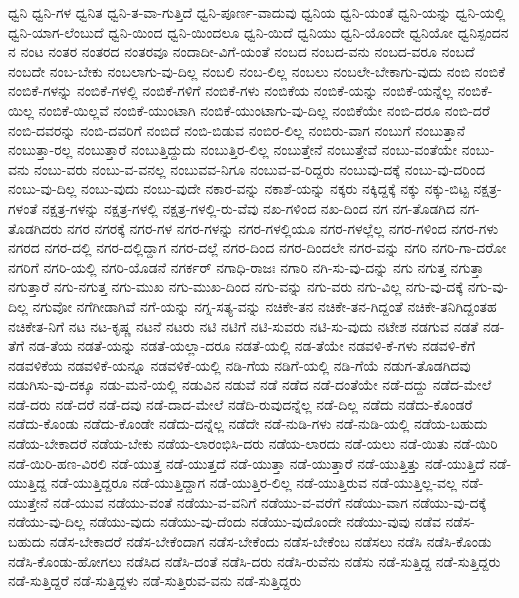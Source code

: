 {ಧ್ವನಿ
ಧ್ವನಿ-ಗಳ
ಧ್ವನಿತ
ಧ್ವನಿ-ತ-ವಾ-ಗುತ್ತಿದೆ
ಧ್ವನಿ-ಪೂರ್ಣ-ವಾದುವು
ಧ್ವನಿಯ
ಧ್ವನಿ-ಯಂತೆ
ಧ್ವನಿ-ಯನ್ನು
ಧ್ವನಿ-ಯಲ್ಲಿ
ಧ್ವನಿ-ಯಾಗ-ಲೆಂಬುದೆ
ಧ್ವನಿ-ಯಿಂದ
ಧ್ವನಿ-ಯಿಂದಲೂ
ಧ್ವನಿ-ಯಿದೆ
ಧ್ವನಿಯು
ಧ್ವನಿ-ಯೊಂದೇ
ಧ್ವನಿಯೋ
ಧ್ವನಿಸ್ಪಂದನ
ನ
ನಂಟ
ನಂತರ
ನಂತರದ
ನಂತರವೂ
ನಂದಾದೀ-ವಿಗೆ-ಯಂತೆ
ನಂಬದ
ನಂಬದ-ವನು
ನಂಬದ-ವರೂ
ನಂಬದೆ
ನಂಬದೇ
ನಂಬ-ಬೇಕು
ನಂಬಲಾಗು-ವು-ದಿಲ್ಲ
ನಂಬಲಿ
ನಂಬ-ಲಿಲ್ಲ
ನಂಬಲು
ನಂಬಲೇ-ಬೇಕಾಗು-ವುದು
ನಂಬಿ
ನಂಬಿಕೆ
ನಂಬಿಕೆ-ಗಳನ್ನು
ನಂಬಿಕೆ-ಗಳಲ್ಲಿ
ನಂಬಿಕೆ-ಗಳಿಗೆ
ನಂಬಿಕೆ-ಗಳು
ನಂಬಿಕೆಯ
ನಂಬಿಕೆ-ಯನ್ನು
ನಂಬಿಕೆ-ಯನ್ನೆಲ್ಲ
ನಂಬಿಕೆ-ಯಿಲ್ಲ
ನಂಬಿಕೆ-ಯಿಲ್ಲವೆ
ನಂಬಿಕೆ-ಯುಂಟಾಗಿ
ನಂಬಿಕೆ-ಯುಂಟಾಗು-ವು-ದಿಲ್ಲ
ನಂಬಿಕೆಯೇ
ನಂಬಿ-ದರೂ
ನಂಬಿ-ದರೆ
ನಂಬಿ-ದವರನ್ನು
ನಂಬಿ-ದವರಿಗೆ
ನಂಬಿದೆ
ನಂಬಿ-ಬಿಡುವ
ನಂಬಿರ-ಲಿಲ್ಲ
ನಂಬಿರು-ವಾಗ
ನಂಬುಗೆ
ನಂಬುತ್ತಾನೆ
ನಂಬುತ್ತಾ-ರಲ್ಲ
ನಂಬುತ್ತಾರೆ
ನಂಬುತ್ತಿದ್ದುದು
ನಂಬುತ್ತಿರ-ಲಿಲ್ಲ
ನಂಬುತ್ತೇನೆ
ನಂಬುತ್ತೇವೆ
ನಂಬು-ವಂತೆಯೇ
ನಂಬು-ವನು
ನಂಬು-ವರು
ನಂಬು-ವ-ವನಲ್ಲ
ನಂಬುವವ-ನಿಗೂ
ನಂಬುವ-ವ-ರಿದ್ದರು
ನಂಬುವು-ದಕ್ಕೆ
ನಂಬು-ವು-ದರಿಂದ
ನಂಬು-ವು-ದಿಲ್ಲ
ನಂಬು-ವುದು
ನಂಬು-ವುದೇ
ನಕಾರ-ವನ್ನು
ನಕಾಶೆ-ಯನ್ನು
ನಕ್ಕರು
ನಕ್ಕಿದ್ದಕ್ಕೆ
ನಕ್ಕು
ನಕ್ಕು-ಬಿಟ್ಟ
ನಕ್ಷತ್ರ-ಗಳಂತೆ
ನಕ್ಷತ್ರ-ಗಳನ್ನು
ನಕ್ಷತ್ರ-ಗಳಲ್ಲಿ
ನಕ್ಷತ್ರ-ಗಳಲ್ಲಿ-ರು-ವೆವು
ನಖ-ಗಳಿಂದ
ನಖ-ದಿಂದ
ನಗ
ನಗ-ತೊಡಗಿದ
ನಗ-ತೊಡಗಿದರು
ನಗರ
ನಗರಕ್ಕೆ
ನಗರ-ಗಳ
ನಗರ-ಗಳನ್ನು
ನಗರ-ಗಳಲ್ಲಿಯೂ
ನಗರ-ಗಳಲ್ಲೆಲ್ಲ
ನಗರ-ಗಳಿಂದ
ನಗರ-ಗಳು
ನಗರದ
ನಗರ-ದಲ್ಲಿ
ನಗರ-ದಲ್ಲಿದ್ದಾಗ
ನಗರ-ದಲ್ಲೆ
ನಗರ-ದಿಂದ
ನಗರ-ದಿಂದಲೇ
ನಗರ-ವನ್ನು
ನಗರಿ
ನಗರಿ-ಗಾ-ದರೋ
ನಗರಿಗೆ
ನಗರಿ-ಯಲ್ಲಿ
ನಗರಿ-ಯೊಡನೆ
ನಗರ್ಕರ್
ನಗಾಧಿ-ರಾಜಃ
ನಗಾರಿ
ನಗಿ-ಸು-ವು-ದನ್ನು
ನಗು
ನಗುತ್ತ
ನಗುತ್ತಾ
ನಗುತ್ತಾರೆ
ನಗು-ನಗುತ್ತ
ನಗು-ಮುಖ
ನಗು-ಮುಖ-ದಿಂದ
ನಗು-ವನ್ನು
ನಗು-ವರು
ನಗು-ವಿಲ್ಲ
ನಗು-ವು-ದಕ್ಕೆ
ನಗು-ವು-ದಿಲ್ಲ
ನಗುವೋ
ನಗೆಗೀಡಾಗಿವೆ
ನಗೆ-ಯನ್ನು
ನಗ್ನ-ಸತ್ಯ-ವನ್ನು
ನಚಿಕೇ-ತನ
ನಚಿಕೇ-ತನ-ಗಿದ್ದಂತೆ
ನಚಿಕೇ-ತನಿಗಿದ್ದಂತಹ
ನಚಿಕೇತ-ನಿಗೆ
ನಟ
ನಟ-ಕೃಷ್ಣ
ನಟನೆ
ನಟರು
ನಟಿ
ನಟಿಗೆ
ನಟಿ-ಸುವರು
ನಟಿ-ಸು-ವುದು
ನಟೇಶ
ನಡಗುವ
ನಡತೆ
ನಡ-ತೆಗೆ
ನಡ-ತೆಯ
ನಡತೆ-ಯನ್ನು
ನಡತೆ-ಯಲ್ಲಾ-ದರೂ
ನಡತೆ-ಯಲ್ಲಿ
ನಡ-ತೆಯೇ
ನಡವಳಿ-ಕೆ-ಗಳು
ನಡವಳಿ-ಕೆಗೆ
ನಡವಳಿಕೆಯ
ನಡವಳಿಕೆ-ಯನ್ನೂ
ನಡವಳಿಕೆ-ಯಲ್ಲಿ
ನಡಿ-ಗೆಯ
ನಡಿಗೆ-ಯಲ್ಲಿ
ನಡಿ-ಗೆಯೆ
ನಡುಗ-ತೊಡಗಿದವು
ನಡುಗಿಸು-ವು-ದಕ್ಕೂ
ನಡು-ಮನೆ-ಯಲ್ಲಿ
ನಡುವಿನ
ನಡುವೆ
ನಡೆ
ನಡೆದ
ನಡೆ-ದಂತೆಯೇ
ನಡೆ-ದದ್ದು
ನಡೆದ-ಮೇಲೆ
ನಡೆ-ದರು
ನಡೆ-ದರೆ
ನಡೆ-ದವು
ನಡೆ-ದಾದ-ಮೇಲೆ
ನಡೆದಿ-ರುವುದನ್ನೆಲ್ಲ
ನಡೆ-ದಿಲ್ಲ
ನಡೆದು
ನಡೆದು-ಕೊಂಡರೆ
ನಡೆದು-ಕೊಂಡು
ನಡೆದು-ಕೊಂಡೇ
ನಡೆದು-ದನ್ನೆಲ್ಲ
ನಡೆದೇ
ನಡೆ-ನುಡಿ-ಗಳು
ನಡೆ-ನುಡಿ-ಯಲ್ಲಿ
ನಡೆಯ-ಬಹುದು
ನಡೆಯ-ಬೇಕಾದರೆ
ನಡೆಯ-ಬೇಕು
ನಡೆಯ-ಲಾರಂಭಿಸಿ-ದರು
ನಡೆಯ-ಲಾರದು
ನಡೆ-ಯಲು
ನಡೆ-ಯಿತು
ನಡೆ-ಯಿರಿ
ನಡೆ-ಯಿರಿ-ಹಣ-ವಿರಲಿ
ನಡೆ-ಯುತ್ತ
ನಡೆ-ಯುತ್ತದೆ
ನಡೆ-ಯುತ್ತಾ
ನಡೆ-ಯುತ್ತಾರೆ
ನಡೆ-ಯುತ್ತಿತ್ತು
ನಡೆ-ಯುತ್ತಿದೆ
ನಡೆ-ಯುತ್ತಿದ್ದ
ನಡೆ-ಯುತ್ತಿದ್ದರೂ
ನಡೆ-ಯುತ್ತಿದ್ದಾಗ
ನಡೆ-ಯುತ್ತಿರ-ಲಿಲ್ಲ
ನಡೆ-ಯುತ್ತಿರುವ
ನಡೆ-ಯುತ್ತಿಲ್ಲ-ವಲ್ಲ
ನಡೆ-ಯುತ್ತೇನೆ
ನಡೆ-ಯುವ
ನಡೆಯು-ವಂತೆ
ನಡೆಯು-ವ-ವನಿಗೆ
ನಡೆಯು-ವ-ವರೆಗೆ
ನಡೆಯು-ವಾಗ
ನಡೆಯು-ವು-ದಕ್ಕೆ
ನಡೆಯು-ವು-ದಿಲ್ಲ
ನಡೆಯು-ವುದು
ನಡೆಯು-ವು-ದೆಂದು
ನಡೆಯು-ವುದೊಂದೇ
ನಡೆಯು-ವುವು
ನಡೆವ
ನಡೆಸ-ಬಹುದು
ನಡೆಸ-ಬೇಕಾದರೆ
ನಡೆಸ-ಬೇಕೆಂದಾಗ
ನಡೆಸ-ಬೇಕೆಂದು
ನಡೆಸ-ಬೇಕೆಂಬ
ನಡೆಸಲು
ನಡೆಸಿ
ನಡೆಸಿ-ಕೊಂಡು
ನಡೆಸಿ-ಕೊಂಡು-ಹೋಗಲು
ನಡೆಸಿದ
ನಡೆಸಿ-ದಂತೆ
ನಡೆಸಿ-ದರು
ನಡೆಸಿ-ರುವೆನು
ನಡೆಸು
ನಡೆ-ಸುತ್ತಿದ್ದ
ನಡೆ-ಸುತ್ತಿದ್ದರು
ನಡೆ-ಸುತ್ತಿದ್ದರೆ
ನಡೆ-ಸುತ್ತಿದ್ದಳು
ನಡೆ-ಸುತ್ತಿರುವ-ವನು
ನಡೆ-ಸುತ್ತಿದ್ದರು
}
